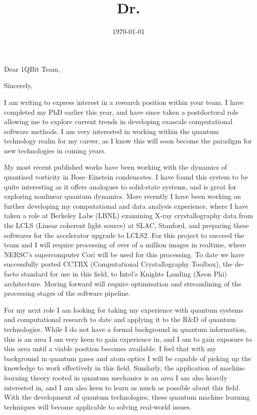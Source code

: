 \documentclass[11pt,a4paper,unicode]{moderncv}
\title{Dr.}
\begin{document}
    \recipient{}{}
    \date{\today} %
    \opening{Dear 1QBit Team,}
    \closing{Sincerely,}
    \makelettertitle
{
    \vspace{-0.5cm}
    I am writing to express interest in a research position within your team. I have completed my PhD earlier this year, and have since taken a postdoctoral role allowing me to explore current trends in developing exascale computational software methods. I am very interested in working within the quantum technology realm for my career, as I know this will soon become the paradigm for new technologies in coming years.

    My most recent published works have been working with the dynamics of quantised vorticity in Bose--Einstein condensates. I have found this system to be quite interesting as it offers analogues to solid-state systems, and is great for exploring nonlinear quantum dynamics. More recently I have been working on further developing my computational and data analysis experience, where I have taken a role at Berkeley Labs (LBNL) examining X-ray crystallography data from the LCLS (Linear coherent light source) at SLAC, Stanford, and preparing these softwares for the accelerator upgrade to LCLS2. For this project to succeed the team and I will require processing of over of a million images in realtime, where NERSC's supercomputer Cori will be used for this processing. To date we have successfully ported CCTBX (Computational Crystallography Toolbox), the de-facto standard for use in this field, to Intel's Knights Landing (Xeon Phi) architecture. Moving forward will require optimisation and streamlining of the processing stages of the software pipeline.

    For my next role I am looking for taking my experience with quantum systems and computational research to date and applying it to the R\&D of quantum technologies. While I do not have a formal background in quantum information, this is an area I am very keen to gain experience in, and I am to gain exposure to this area until a viable position becomes available. I feel that with my background in quantum gases and atom optics I will be capable of picking up the knowledge to work effectively in this field. Similarly, the application of machine learning theory rooted in quantum mechanics is an area I am also heavily interested in, and I am also keen to learn as much as possible about this field. With the development of quantum technologies, these quantum machine learning techniques will become applicable to solving real-world issues.

}
\end{document}
